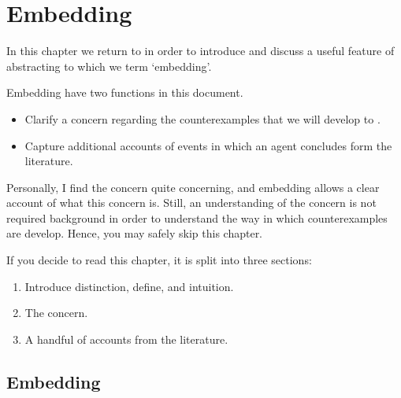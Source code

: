 \chapter{Embedding }
\label{cha:embed}


\begin{note}
  In this chapter we return to  in order to introduce and discuss a useful feature of abstracting to  which we term `embedding'.

  Embedding have two functions in this document.
  \begin{itemize}
  \item
    Clarify a concern regarding the counterexamples that we will develop to \issueConstraint{}.
  \item
    Capture additional accounts of events in which an agent concludes form the literature.
  \end{itemize}

  Personally, I find the concern quite concerning, and embedding allows a clear account of what this concern is.
  Still, an understanding of the concern is not required background in order to understand the way in which counterexamples are develop.
  Hence, you may safely skip this chapter.
\end{note}

\begin{note}
  If you decide to read this chapter, it is split into three sections:

  \begin{enumerate}[label=]
  \item

    Introduce distinction, define, and intuition.
  \item

    The concern.
  \item

    A handful of accounts from the literature.
  \end{enumerate}
\end{note}

\section{Embedding }
\label{cha:var:ros:Emb}

